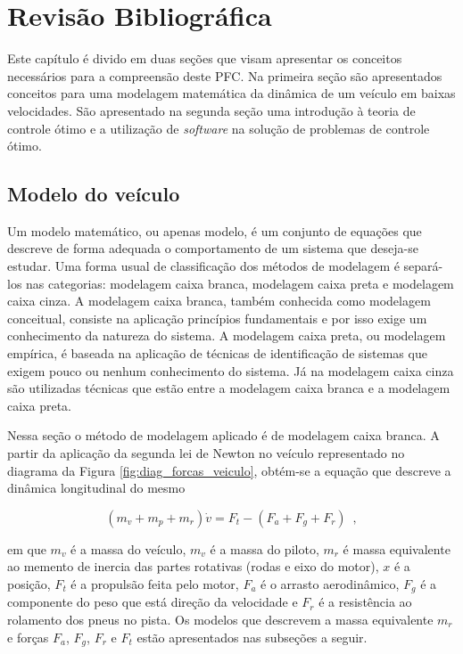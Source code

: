 \chapter[Revisão Bibliográfica]{Revisão Bibliográfica}
\label{chap:revisao}
\thispagestyle{empty}

Este capítulo é divido em duas seções que visam apresentar os conceitos necessários para a compreensão deste PFC.
Na primeira seção são apresentados conceitos para uma modelagem matemática da dinâmica de um veículo em baixas velocidades.
São apresentado na segunda seção uma introdução à teoria de controle ótimo e a utilização de \textit{software} na solução
de problemas de controle ótimo.

\section{Modelo do veículo}
\label{sec:modelo}

Um modelo matemático, ou apenas modelo, é um conjunto de equações que descreve de forma adequada o comportamento de um sistema que deseja-se estudar.
Uma forma usual de classificação dos métodos de modelagem é separá-los nas categorias: modelagem caixa branca, modelagem caixa preta e modelagem
caixa cinza.
A modelagem caixa branca, também conhecida como modelagem conceitual, consiste na aplicação princípios fundamentais e por isso exige um conhecimento
da natureza do sistema.
A modelagem caixa preta, ou modelagem empírica, é baseada na aplicação de técnicas de identificação de sistemas que exigem pouco ou
nenhum conhecimento do sistema.
Já na modelagem caixa cinza são utilizadas técnicas que estão entre a modelagem caixa branca e a modelagem caixa preta. \cite[Seç.~1.1]{book:Aguirre}

Nessa seção o método de modelagem aplicado é de modelagem caixa branca. A partir da aplicação da segunda lei de Newton no
veículo representado no diagrama da Figura \ref{fig:diag_forcas_veiculo}, obtém-se a equação que descreve a dinâmica longitudinal do mesmo

\begin{equation}
	\label{eq:SomaForcas}
	(m_v + m_p + m_r) \dot v = F_t - (F_a + F_g + F_r)
	\enspace,
\end{equation}

em que $m_v$ é a massa do veículo, $m_v$ é a massa do piloto,  $m_r$ é massa equivalente ao memento de inercia das partes rotativas (rodas e eixo do motor),  $x$ é a posição, $F_{t}$ é a propulsão feita pelo motor, $F_{a}$ é o
arrasto aerodinâmico, $F_g$ é a componente do peso que está direção da velocidade e $F_{r}$ é a resistência ao rolamento dos pneus no pista.
Os modelos que descrevem a massa equivalente $m_r$ e forças $F_{a}$, $F_g$, $F_{r}$ e $F_{t}$ estão apresentados nas subseções a seguir.

